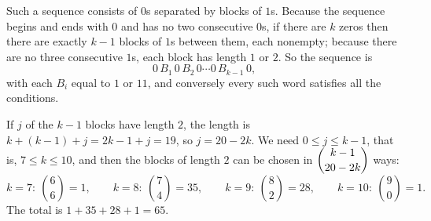Such a sequence consists of $0$s separated by blocks of $1$s. Because the sequence begins and ends with $0$ and has no two consecutive $0$s, if there are $k$ zeros then there are exactly $k-1$ blocks of $1$s between them, each nonempty; because there are no three consecutive $1$s, each block has length $1$ or $2$. So the sequence is
\[0\,B_1\,0\,B_2\,0\cdots0\,B_{k-1}\,0,\]
with each $B_i$ equal to $1$ or $11$, and conversely every such word satisfies all the conditions.

If $j$ of the $k-1$ blocks have length $2$, the length is $k+(k-1)+j=2k-1+j=19$, so $j=20-2k$. We need $0\le j\le k-1$, that is, $7\le k\le10$, and then the blocks of length $2$ can be chosen in $\dbinom{k-1}{20-2k}$ ways:
\[k=7:\ \binom66=1,\qquad k=8:\ \binom74=35,\qquad k=9:\ \binom82=28,\qquad k=10:\ \binom90=1 .\]
The total is $1+35+28+1=\boxed{65}$.
